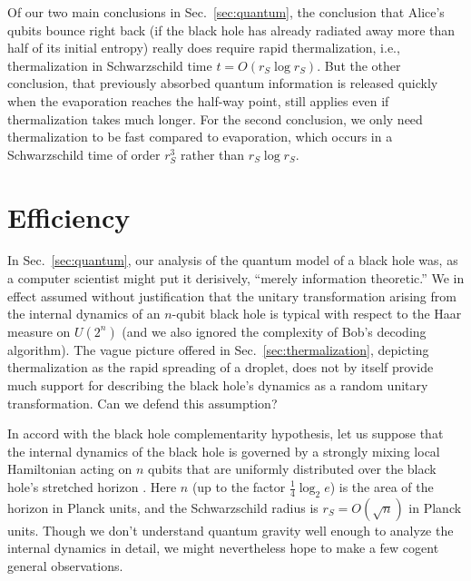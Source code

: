 \documentclass[11pt]{article}
\begin{document}
Of our two main conclusions in Sec.~\ref{sec:quantum}, the conclusion that Alice's qubits bounce right back (if the black hole has already radiated away more than half of its initial entropy) really does require rapid thermalization, i.e., thermalization in Schwarzschild time $t=O(r_S\log r_S)$. But the other conclusion, that previously absorbed quantum information is released quickly when the evaporation reaches the half-way point, still applies even if thermalization takes much longer. For the second conclusion, we only need thermalization to be fast compared to evaporation, which occurs in a Schwarzschild time of order $r_S^3$ rather than $r_S\log r_S$.

\section{Efficiency}
\label{sec:efficiency}

In Sec.~\ref{sec:quantum}, our analysis of the quantum model of a black hole was, as a computer scientist might put it derisively, ``merely information theoretic.'' We in effect assumed without justification that the unitary transformation arising from the internal dynamics of an $n$-qubit black hole is typical with respect to the Haar measure on $U(2^n)$ (and we also ignored the complexity of Bob's decoding algorithm). The vague picture offered in Sec.~\ref{sec:thermalization}, depicting thermalization as the rapid spreading of a droplet, does not by itself provide much support for describing the black hole's dynamics as a random unitary transformation. Can we defend this assumption?

In accord with the black hole complementarity hypothesis, let us suppose that the internal dynamics of the black hole is governed by a strongly mixing local Hamiltonian acting on $n$ qubits that are uniformly distributed over the black hole's stretched horizon \cite{complement,susskind-book}. Here $n$ (up to the factor $\frac{1}{4}\log_2 e$) is the area of the horizon in Planck units, and the Schwarzschild radius is $r_S=O(\sqrt{n})$ in Planck units. Though we don't understand quantum gravity well enough to analyze the internal dynamics in detail,  we might nevertheless hope to make a few cogent general observations.
\end{document}
